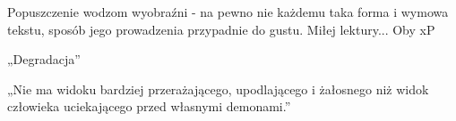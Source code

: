 \documentclass[../MAIN.tex]{subfiles}
\begin{document}
Popuszczenie wodzom wyobraźni - na pewno nie każdemu taka forma i wymowa tekstu, sposób jego prowadzenia przypadnie do gustu. Miłej lektury... Oby xP

„Degradacja”

„Nie ma widoku bardziej przerażającego, upodlającego i żałosnego niż widok człowieka uciekającego przed własnymi demonami.”
\end{document}
